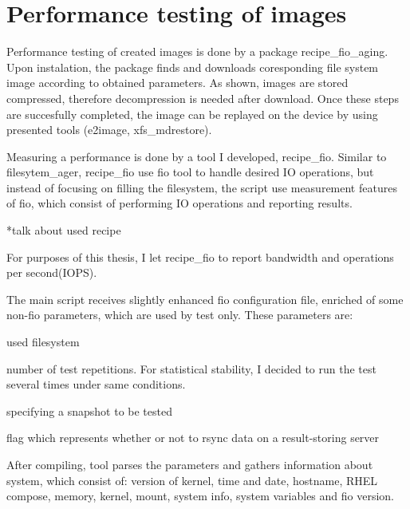\documentclass[
  color, %
  table, %
  lof,   %
  lot,   %
]{fithesis3}
\begin{document}



\section{Performance testing of images}
Performance testing of created images is done by a package recipe\_fio\_aging. Upon instalation, the package finds and downloads coresponding file system image according to obtained parameters. As shown, images are stored compressed, therefore decompression is needed after download. Once these steps are succesfully completed, the image can be replayed on the device by using presented tools (e2image, xfs\_mdrestore).


Measuring a performance is done by a tool I developed, recipe\_fio. Similar to filesytem\_ager, recipe\_fio use fio tool to handle desired IO operations, but instead of focusing on filling the filesystem, the script use measurement features of fio, which consist of performing IO operations and reporting results.

*talk about used recipe

For purposes of this thesis, I let recipe\_fio to report bandwidth and operations per second(IOPS).

The main script receives slightly enhanced fio configuration file, enriched of some non-fio parameters, which are used by test only. These parameters are:
\begin{compactenum}
  \item used filesystem
  \item number of test repetitions. For statistical stability, I decided to run the test several times under same conditions.
  \item specifying a snapshot to be tested
  \item flag which represents whether or not to rsync data on a result-storing server
  \end{compactenum}

After compiling, tool parses the parameters and gathers information about system, which consist of: version of kernel, time and date, hostname, RHEL compose, memory, kernel, mount, system info, system variables and fio version.
\end{document}
